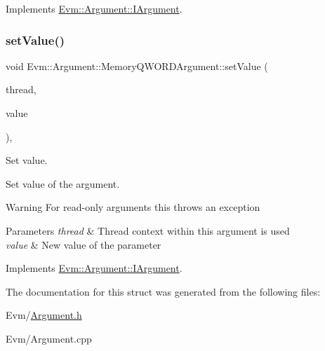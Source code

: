 Implements \mbox{\hyperlink{struct_evm_1_1_argument_1_1_i_argument_afcab2d2a1515518a111881a635c83da3}{Evm\+::\+Argument\+::\+I\+Argument}}.

\mbox{\label{struct_evm_1_1_argument_1_1_memory_q_w_o_r_d_argument_aff2a33f879d440a90c93a7635c5d705a}} 
\subsubsection{\texorpdfstring{set\+Value()}{setValue()}}
{\footnotesize\ttfamily void Evm\+::\+Argument\+::\+Memory\+Q\+W\+O\+R\+D\+Argument\+::set\+Value (\begin{DoxyParamCaption}\item[{\mbox{\hyperlink{struct_evm_1_1_thread_context}{Thread\+Context}} \&}]{thread,  }\item[{uint64\+\_\+t}]{value }\end{DoxyParamCaption})\hspace{0.3cm}{\ttfamily [override]}, {\ttfamily [virtual]}}



Set value. 

Set value of the argument. \begin{DoxyWarning}{Warning}
For read-\/only arguments this throws an exception 
\end{DoxyWarning}

\begin{DoxyParams}{Parameters}
{\em thread} & Thread context within this argument is used \\
\hline
{\em value} & New value of the parameter \\
\hline
\end{DoxyParams}


Implements \mbox{\hyperlink{struct_evm_1_1_argument_1_1_i_argument_a24e4c76f2750e664e3895d2ff4b9146d}{Evm\+::\+Argument\+::\+I\+Argument}}.



The documentation for this struct was generated from the following files\+:\begin{DoxyCompactItemize}
\item 
Evm/\mbox{\hyperlink{_argument_8h}{Argument.\+h}}\item 
Evm/Argument.\+cpp\end{DoxyCompactItemize}
